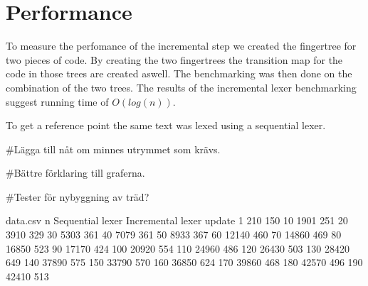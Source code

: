 \section{Performance}
To measure the perfomance of the incremental step we created the fingertree for
two pieces of code. By creating the two fingertrees the transition map for the
code in those trees are created aswell. The benchmarking was then done on the
combination of the two trees. The results of the incremental lexer benchmarking
suggest running time of $O(log(n))$.

To get a reference point the same text was lexed using a sequential lexer.

\#Lägga till nåt om minnes utrymmet som krävs.

\#Bättre förklaring till graferna.

\#Tester för nybyggning av träd?

\begin{filecontents*}{data.csv}
n {Sequential lexer} {Incremental lexer update}
1    210    150
10   1901   251
20   3910   329
30   5303   361
40   7079   361
50   8933   367
60   12140  460
70   14860  469
80   16850  523
90   17170  424
100  20920  554
110  24960  486
120  26430  503
130  28420  649
140  37890  575
150  33790  570
160  36850  624
170  39860  468
180  42570  496
190  42410  513
\end{filecontents*}
\begin{example}\label{bench}
\\
\end{example}

